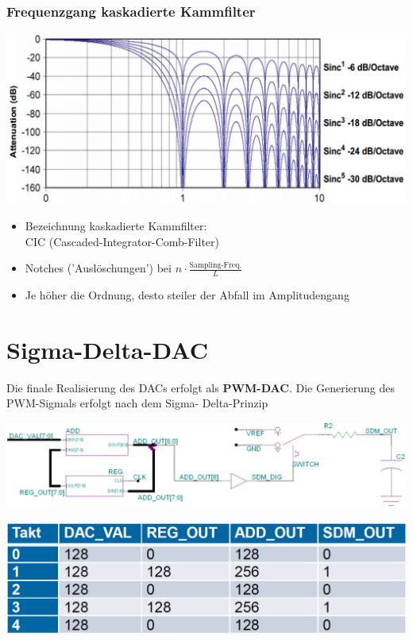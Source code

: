 \subsubsection*{Frequenzgang kaskadierte Kammfilter}

\begin{minipage}[c]{0.4\columnwidth}
    \includegraphics[width=\columnwidth]{images/frequenzgang_kaskadierte_kammfilter.png}
\end{minipage}
\hfill
\begin{minipage}[c]{0.58\columnwidth}
    \begin{itemize}
        \item Bezeichnung kaskadierte Kammfilter: \\
            CIC (Cascaded-Integrator-Comb-Filter)
        \item Notches ('Auslöschungen') bei $n \cdot \frac{\text{Sampling-Freq.}}{L}$
        \item Je höher die Ordnung, desto steiler der Abfall im Amplitudengang
    \end{itemize}
\end{minipage}


\section{Sigma-Delta-DAC}

Die finale Realisierung des DACs erfolgt als \textbf{PWM-DAC}. Die Generierung des PWM-Sigmals erfolgt nach dem Sigma-
Delta-Prinzip

\begin{minipage}[t]{0.58\columnwidth}
    \includegraphics[width=\columnwidth]{images/sigma-delta_DAC.png}
\end{minipage}
\hfill
\begin{minipage}[t]{0.38\columnwidth}
    \includegraphics[width=\columnwidth]{images/sigma-delta_DAC_verlauf.png}
\end{minipage}

